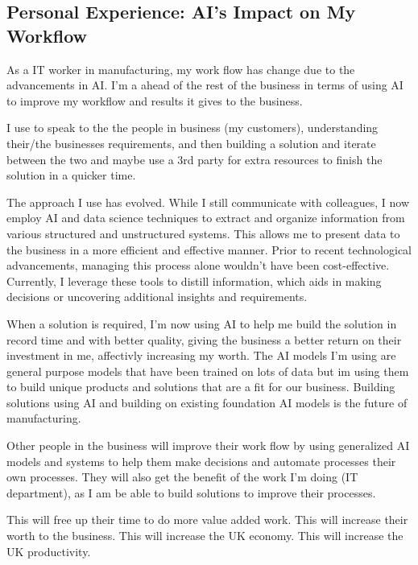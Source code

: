 \documentclass[
  letterpaper,
  DIV=11,
  numbers=noendperiod]{scrartcl}
\begin{document}
\hypertarget{personal-experience-ais-impact-on-my-workflow}{%
\subsection{Personal Experience: AI's Impact on My
Workflow}\label{personal-experience-ais-impact-on-my-workflow}}

As a IT worker in manufacturing, my work flow has change due to the
advancements in AI. I'm a ahead of the rest of the business in terms of
using AI to improve my workflow and results it gives to the business.

I use to speak to the the people in business (my customers),
understanding their/the businesses requirements, and then building a
solution and iterate between the two and maybe use a 3rd party for extra
resources to finish the solution in a quicker time.

The approach I use has evolved. While I still communicate with
colleagues, I now employ AI and data science techniques to extract and
organize information from various structured and unstructured systems.
This allows me to present data to the business in a more efficient and
effective manner. Prior to recent technological advancements, managing
this process alone wouldn't have been cost-effective. Currently, I
leverage these tools to distill information, which aids in making
decisions or uncovering additional insights and requirements.

When a solution is required, I'm now using AI to help me build the
solution in record time and with better quality, giving the business a
better return on their investment in me, affectivly increasing my worth.
The AI models I'm using are general purpose models that have been
trained on lots of data but im using them to build unique products and
solutions that are a fit for our business. Building solutions using AI
and building on existing foundation AI models is the future of
manufacturing.

Other people in the business will improve their work flow by using
generalized AI models and systems to help them make decisions and
automate processes their own processes. They will also get the benefit
of the work I'm doing (IT department), as I am be able to build
solutions to improve their processes.

This will free up their time to do more value added work. This will
increase their worth to the business. This will increase the UK economy.
This will increase the UK productivity.
\end{document}
